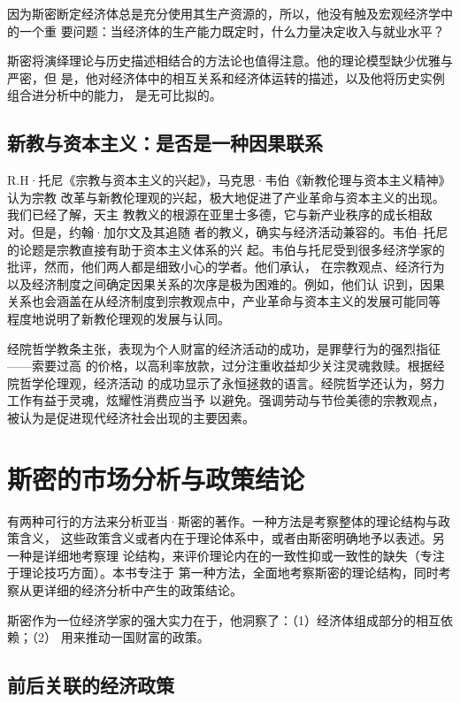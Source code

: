 因为斯密断定经济体总是充分使用其生产资源的，所以，他没有触及宏观经济学中的一个重
要问题：当经济体的生产能力既定时，什么力量决定收入与就业水平？

斯密将演绎理论与历史描述相结合的方法论也值得注意。他的理论模型缺少优雅与严密，但
是，他对经济体中的相互关系和经济体运转的描述，以及他将历史实例组合进分析中的能力，
是无可比拟的。

\subsection{新教与资本主义：是否是一种因果联系}

R.H·托尼《宗教与资本主义的兴起》，马克思·韦伯《新教伦理与资本主义精神》认为宗教
改革与新教伦理观的兴起，极大地促进了产业革命与资本主义的出现。我们已经了解，天主
教教义的根源在亚里士多德，它与新产业秩序的成长相敌对。但是，约翰·加尔文及其追随
者的教义，确实与经济活动兼容的。韦伯--托尼的论题是宗教直接有助于资本主义体系的兴
起。韦伯与托尼受到很多经济学家的批评，然而，他们两人都是细致小心的学者。他们承认，
在宗教观点、经济行为以及经济制度之间确定因果关系的次序是极为困难的。例如，他们认
识到，因果关系也会涵盖在从经济制度到宗教观点中，产业革命与资本主义的发展可能同等
程度地说明了新教伦理观的发展与认同。

经院哲学教条主张，表现为个人财富的经济活动的成功，是罪孽行为的强烈指征——索要过高
的价格，以高利率放款，过分注重收益却少关注灵魂救赎。根据经院哲学伦理观，经济活动
的成功显示了永恒拯救的语言。经院哲学还认为，努力工作有益于灵魂，炫耀性消费应当予
以避免。强调劳动与节俭美德的宗教观点，被认为是促进现代经济社会出现的主要因素。

\section{斯密的市场分析与政策结论}

有两种可行的方法来分析亚当·斯密的著作。一种方法是考察整体的理论结构与政策含义，
这些政策含义或者内在于理论体系中，或者由斯密明确地予以表述。另一种是详细地考察理
论结构，来评价理论内在的一致性抑或一致性的缺失（专注于理论技巧方面）。本书专注于
第一种方法，全面地考察斯密的理论结构，同时考察从更详细的经济分析中产生的政策结论。

斯密作为一位经济学家的强大实力在于，他洞察了：（1）经济体组成部分的相互依赖；（2）
用来推动一国财富的政策。

\subsection{前后关联的经济政策}

